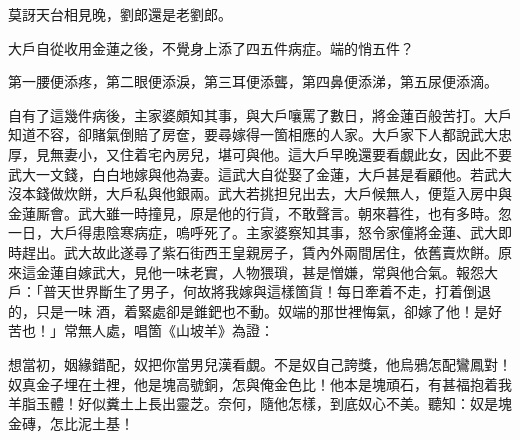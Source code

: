 莫訝天台相見晚，劉郎還是老劉郎。{}

大戶自從收用金蓮之後，不覺身上添了四五件病症。{}端的悄五件？

第一腰便添疼，第二眼便添淚，第三耳便添聾，第四鼻便添涕，第五尿便添滴。

自有了這幾件病後，主家婆頗知其事，與大戶嚷罵了數日，將金蓮百般苦打。大戶知道不容，卻賭氣倒賠了房奩，要尋嫁得一箇相應的人家。大戶家下人都說武大忠厚，見無妻小，又住着宅內房兒，堪可與他。這大戶早晚還要看覷此女，{}因此不要武大一文錢，白白地嫁與他為妻。這武大自從娶了金蓮，大戶甚是看顧他。若武大沒本錢做炊餅，大戶私與他銀兩。武大若挑担兒出去，大戶候無人，便踅入房中與金蓮厮會。武大雖一時撞見，原是他的行貨，不敢聲言。朝來暮徃，也有多時。忽一日，大戶得患陰寒病症，嗚呼死了。主家婆察知其事，怒令家僮將金蓮、武大即時趕出。武大故此遂尋了紫石街西王皇親房子，賃內外兩間居住，依舊賣炊餅。原來這金蓮自嫁武大，見他一味老實，人物猥瑣，甚是憎嫌，{}常與他合氣。報怨大戶：「普天世界斷生了男子，何故將我嫁與這樣箇貨！每日牽着不走，打着倒退的，只是一味𠳹酒，着緊處卻是錐鈀也不動。奴端的那世裡悔氣，卻嫁了他！是好苦也！」常無人處，唱箇《山坡羊》為證：

想當初，姻緣錯配，奴把你當男兒漢看覷。不是奴自己誇獎，他烏鴉怎配鸞鳳對！奴真金子埋在土裡，他是塊高號銅，怎與俺金色比！他本是塊頑石，有甚福抱着我羊脂玉體！好似糞土上長出靈芝。奈何，隨他怎樣，到底奴心不美。聽知：奴是塊金磚，怎比泥土基！

